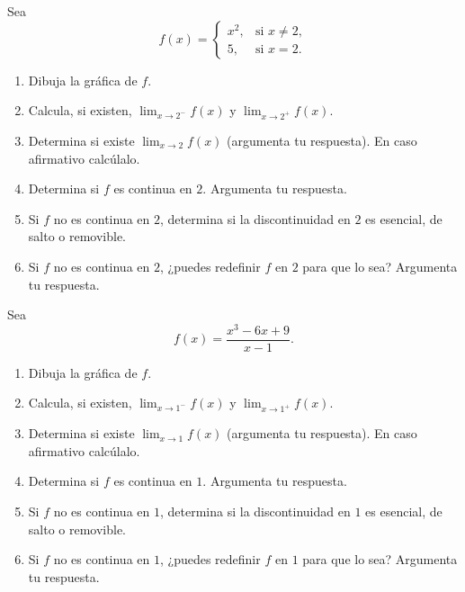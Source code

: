 \documentclass[12pt,a4paper]{book}
\begin{document}
    \begin{ejercicio}\label{ej:216}
        Sea
        \begin{equation*}
            f(x)=\begin{cases}
                x^{2}, & \text{si }x\neq 2,\\
                5, & \text{si }x=2.
            \end{cases}
        \end{equation*}
        \begin{enumerate}[nosep]
            \item Dibuja la gráfica de $f$.
            \item Calcula, si existen, $\lim_{x\to 2^{-}}f(x)$ y $\lim_{x\to 2^{+}}f(x)$.
            \item Determina si existe $\lim_{x\to 2}f(x)$ (argumenta tu respuesta). En caso afirmativo
            calcúlalo.
            \item Determina si $f$ es continua en $2$. Argumenta tu respuesta.
            \item Si $f$ no es continua en $2$, determina si la discontinuidad en $2$ es esencial,
            de salto o removible.
            \item Si $f$ no es continua en $2$, ¿puedes redefinir $f$ en $2$ para que lo sea? Argumenta
            tu respuesta.
        \end{enumerate}
    \end{ejercicio}

    \begin{ejercicio}\label{ej:217}
        Sea
        \begin{equation*}
            f(x)=\frac{x^{3}-6x+9}{x-1}.
        \end{equation*}
        \begin{enumerate}[nosep]
            \item Dibuja la gráfica de $f$.
            \item Calcula, si existen, $\lim_{x\to 1^{-}}f(x)$ y $\lim_{x\to 1^{+}}f(x)$.
            \item Determina si existe $\lim_{x\to 1}f(x)$ (argumenta tu respuesta). En caso afirmativo
            calcúlalo.
            \item Determina si $f$ es continua en $1$. Argumenta tu respuesta.
            \item Si $f$ no es continua en $1$, determina si la discontinuidad en $1$ es esencial,
            de salto o removible.
            \item Si $f$ no es continua en $1$, ¿puedes redefinir $f$ en $1$ para que lo sea? Argumenta
            tu respuesta.
        \end{enumerate}
    \end{ejercicio}
\end{document}
